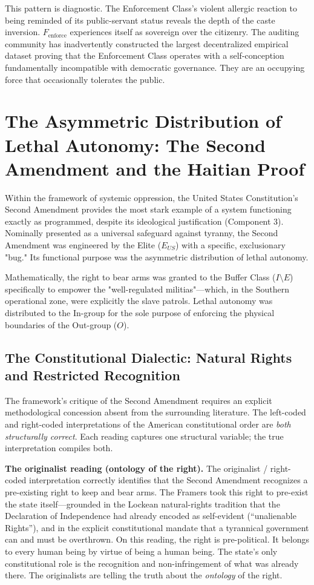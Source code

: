 This pattern is diagnostic. The Enforcement Class's violent allergic reaction to being reminded of its public-servant status reveals the depth of the caste inversion. $F_{\text{enforce}}$ experiences itself as sovereign over the citizenry. The auditing community has inadvertently constructed the largest decentralized empirical dataset proving that the Enforcement Class operates with a self-conception fundamentally incompatible with democratic governance. They are an occupying force that occasionally tolerates the public.

\section{The Asymmetric Distribution of Lethal Autonomy: The Second Amendment and the Haitian Proof}

Within the framework of systemic oppression, the United States Constitution’s Second Amendment provides the most stark example of a system functioning exactly as programmed, despite its ideological justification (Component 3). Nominally presented as a universal safeguard against tyranny, the Second Amendment was engineered by the Elite ($E_{US}$) with a specific, exclusionary "bug." Its functional purpose was the asymmetric distribution of lethal autonomy.

Mathematically, the right to bear arms was granted to the Buffer Class ($I \setminus E$) specifically to empower the "well-regulated militias"—which, in the Southern operational zone, were explicitly the slave patrols. Lethal autonomy was distributed to the In-group for the sole purpose of enforcing the physical boundaries of the Out-group ($O$).

\subsection{The Constitutional Dialectic: Natural Rights and Restricted Recognition}
\label{sec:constitutional_dialectic}

The framework's critique of the Second Amendment requires an explicit methodological concession absent from the surrounding literature. The left-coded and right-coded interpretations of the American constitutional order are \textit{both structurally correct}. Each reading captures one structural variable; the true interpretation compiles both.

\textbf{The originalist reading (ontology of the right).} The originalist / right-coded interpretation correctly identifies that the Second Amendment recognizes a pre-existing right to keep and bear arms. The Framers took this right to pre-exist the state itself---grounded in the Lockean natural-rights tradition that the Declaration of Independence had already encoded as self-evident (``unalienable Rights''), and in the explicit constitutional mandate that a tyrannical government can and must be overthrown. On this reading, the right is pre-political. It belongs to every human being by virtue of being a human being. The state's only constitutional role is the recognition and non-infringement of what was already there. The originalists are telling the truth about the \textit{ontology} of the right.

